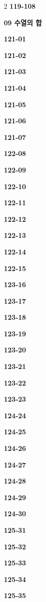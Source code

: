 \documentclass[10pt,a4paper]{article}
\begin{document}
\begin{multicols}{2}
\noindent\textbf{119-108}\ \par
\noindent\textbf{09 수열의 합}\par\smallskip
\noindent\textbf{121-01}\ \par
\noindent\textbf{121-02}\ \par
\noindent\textbf{121-03}\ \par
\noindent\textbf{121-04}\ \par
\noindent\textbf{121-05}\ \par
\noindent\textbf{121-06}\ \par
\noindent\textbf{121-07}\ \par
\noindent\textbf{122-08}\ \par
\noindent\textbf{122-09}\ \par
\noindent\textbf{122-10}\ \par
\noindent\textbf{122-11}\ \par
\noindent\textbf{122-12}\ \par
\noindent\textbf{122-13}\ \par
\noindent\textbf{122-14}\ \par
\noindent\textbf{122-15}\ \par
\noindent\textbf{123-16}\ \par
\noindent\textbf{123-17}\ \par
\noindent\textbf{123-18}\ \par
\noindent\textbf{123-19}\ \par
\noindent\textbf{123-20}\ \par
\noindent\textbf{123-21}\ \par
\noindent\textbf{123-22}\ \par
\noindent\textbf{123-23}\ \par
\noindent\textbf{124-24}\ \par
\noindent\textbf{124-25}\ \par
\noindent\textbf{124-26}\ \par
\noindent\textbf{124-27}\ \par
\noindent\textbf{124-28}\ \par
\noindent\textbf{124-29}\ \par
\noindent\textbf{124-30}\ \par
\noindent\textbf{125-31}\ \par
\noindent\textbf{125-32}\ \par
\noindent\textbf{125-33}\ \par
\noindent\textbf{125-34}\ \par
\noindent\textbf{125-35}\ \par

\end{multicols}
\end{document}
